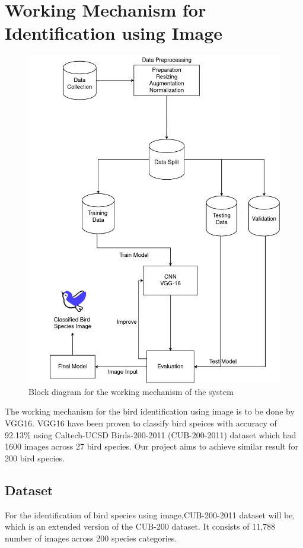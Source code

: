 \newpage

\section{Working Mechanism for Identification using Image}
\begin{figure}[h!]
    \centering
    \includegraphics[scale=0.33]{images/Methodology2.png}
    \caption{Block diagram for the working mechanism of the system}%
\end{figure}
The working mechanism for the bird identification using image is to be done by VGG16. VGG16 have been proven to classify bird speices with accuracy of 92.13\% using Caltech-UCSD Birds-200-2011 (CUB-200-2011) dataset which had 1600 images across 27 bird species\cite{islam2019bird}. Our project aims to achieve similar result for 200 bird species.

\subsection{Dataset}
For the identification of bird species using image,CUB-200-2011
dataset will be, which is an extended version of the CUB-200 dataset. It consists of
11,788 number of images across 200 species categories\cite{WahCUB_200_2011}.

